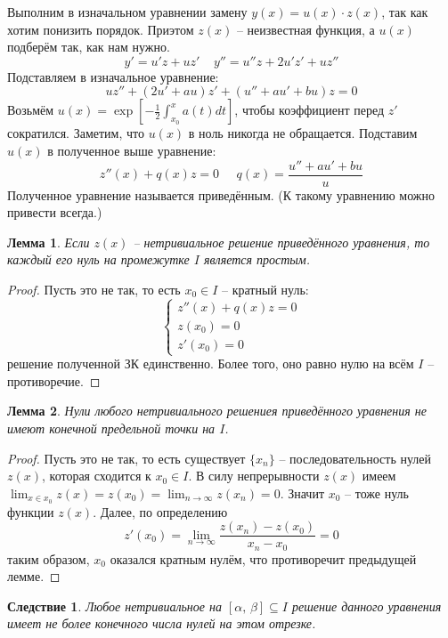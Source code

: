 \documentclass[a4paper,12pt]{article}
\theoremstyle{plain}
\newtheorem{lemma}{Лемма}[section]
\newtheorem*{corollary}{Следствие}
\theoremstyle{definition}
\theoremstyle{remark}
\begin{document}
Выполним в изначальном уравнении замену $y(x) = u(x) \cdot z(x)$, так как хотим понизить порядок. Приэтом $z(x)$ -- неизвестная функция, а $u(x)$ подберём так, как нам нужно.
\[y' = u'z + uz' \;\;\;\; y'' = u''z + 2u'z' + uz''\]
Подставляем в изначальное уравнение:
\[uz'' + (2u' + au)z' + (u'' + au' + bu)z = 0\]
Возьмём $u(x) = \exp\left[-\frac{1}{2}\int_{x_0}^xa(t)dt\right]$, чтобы коэффициент перед $z'$ сократился. Заметим, что $u(x)$ в ноль никогда не обращается. Подставим $u(x)$ в полученное выше уравнение:
\[z''(x) + q(x)z = 0\;\;\;\;\; q(x) = \frac{u'' + au' + bu}{u}\]
Полученное уравнение называется приведённым. (К такому уравнению можно привести всегда.)

\begin{lemma}
	Если $z(x)$ -- нетривиальное решение приведённого уравнения, то каждый его нуль на промежутке $I$ является простым.
\end{lemma}

\begin{proof}
	Пусть это не так, то есть $x_0 \in I$ -- кратный нуль:
	\[
		\begin{cases}
			z''(x) + q(x)z = 0 \\
			z(x_0) = 0         \\
			z'(x_0) = 0
		\end{cases}
	\]
	решение полученной ЗК единственно. Более того, оно равно нулю на всём $I$ -- противоречие.
\end{proof}

\begin{lemma}
	Нули любого нетривиального решениея приведённого уравнения не имеют конечной предельной точки на $I$.
\end{lemma}

\begin{proof}
	Пусть это не так, то есть существует $\{x_n\}$ -- последовательность нулей $z(x)$, которая сходится к $x_0 \in I$. В силу непрерывности $z(x)$ имеем $\lim_{x \in x_0}z(x) = z(x_0) = \lim_{n \to \infty} z(x_n) = 0$. Значит $x_0$ -- тоже нуль функции $z(x)$. Далее, по определению
	\[z'(x_0) = \lim_{n \to \infty} \frac{z(x_n) - z(x_0)}{x_n - x_0} = 0\]
	таким образом, $x_0$ оказался кратным нулём, что противоречит предыдущей лемме.
\end{proof}

\begin{corollary}
	Любое нетривиальное на $[\alpha,\, \beta] \subseteq I$ решение данного уравнения имеет не более конечного числа нулей на этом отрезке.
\end{corollary}
\end{document}
